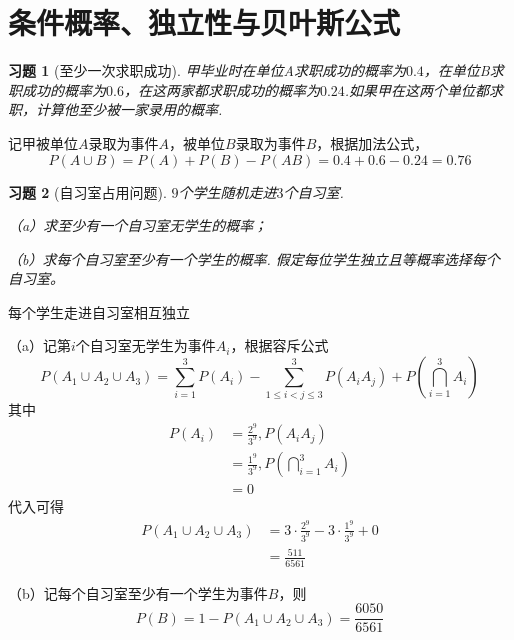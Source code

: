 \documentclass[UTF8,12pt,a4paper,fontset=fandol]{ctexart}
\newtheorem{exercise}{习题}[section]
\begin{document}
\clearpage\section{条件概率、独立性与贝叶斯公式}

\begin{exercise}[至少一次求职成功]\label{q:Y2.1}
甲毕业时在单位A求职成功的概率为$0.4$，在单位B求职成功的概率为$0.6$，在这两家都求职成功的概率为$0.24$.如果甲在这两个单位都求职，计算他至少被一家录用的概率.\par{}
\end{exercise}

\begin{solve}\label{a:Y2.1}
记甲被单位$A$录取为事件$A$，被单位$B$录取为事件$B$，根据加法公式，
\[P(A \cup B) = P(A) + P(B) - P(AB) = 0.4 + 0.6 - 0.24 = 0.76\]
\end{solve}

\begin{exercise}[自习室占用问题]\label{q:Y2.2}
$9$个学生随机走进$3$个自习室.

（a）求至少有一个自习室无学生的概率；

（b）求每个自习室至少有一个学生的概率. 假定每位学生独立且等概率选择每个自习室。\par{}
\end{exercise}

\begin{solve}\label{a:Y2.2}
每个学生走进自习室相互独立

（a）记第$i$个自习室无学生为事件$A_i$，根据容斥公式
\[P({A_1} \cup {A_2} \cup {A_3}) = \sum\limits_{i = 1}^3 {P({A_i})}  - \sum\limits_{1 \leqslant i < j \leqslant 3}^3 {P({A_i}{A_j})}  + P(\bigcap\limits_{i = 1}^3 {{A_i}} )\]
其中
\[\begin{aligned}P({A_i}) &= \frac{{{2^9}}}{{{3^9}}},P({A_i}{A_j}) \\&= \frac{{{1^9}}}{{{3^9}}},P(\bigcap\limits_{i = 1}^3 {{A_i}} ) \\&= 0\end{aligned}\]
代入可得
\[\begin{aligned}P({A_1} \cup {A_2} \cup {A_3}) &= 3 \cdot \frac{{{2^9}}}{{{3^9}}} - 3 \cdot \frac{{{1^9}}}{{{3^9}}} + 0 \\&= \frac{{511}}{{6561}}\end{aligned}\]

（b）记每个自习室至少有一个学生为事件$B$，则
\[P(B) = 1 - P({A_1} \cup {A_2} \cup {A_3}) = \frac{{6050}}{{6561}}\]
\end{solve}
\end{document}
